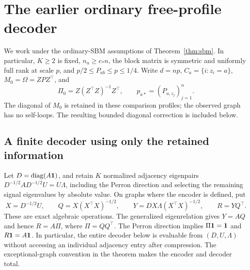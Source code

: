 \section{The earlier ordinary free-profile decoder}
\label{sec:sbm-proof}
\label{sbm:section}

We work under the ordinary-SBM assumptions of Theorem~\ref{thm:sbm}.
In particular, $K\ge2$ is fixed, $n_a\ge c_*n$, the block matrix is
symmetric and uniformly full rank at scale $p$, and
$p/2\le P_{ab}\le p\le1/4$. Write $d=np$, $C_a=\{i:z_i=a\}$,
$M_0=\Omega=ZPZ^\top$, and
\[
 \Pi_0=Z(Z^\top Z)^{-1}Z^\top,
 \qquad p_{a*}=(P_{a,z_j})_{j=1}^n.
\]
The diagonal of $M_0$ is retained in these comparison profiles;
the observed graph has no self-loops. The resulting bounded diagonal
correction is included below.

\subsection{A finite decoder using only the retained information}
\label{sbm:algorithm}

Let $D=\operatorname{diag}(A\mathbf 1)$, and retain $K$ normalized adjacency eigenpairs
$D^{-1/2}AD^{-1/2}U=U\Lambda$, including the Perron direction and
selecting the remaining signal eigenvalues by absolute value. On graphs
where the encoder is defined, put
\[
 X=D^{-1/2}U,\qquad
 Q=X(X^\top X)^{-1/2},\qquad
 Y=DX\Lambda(X^\top X)^{-1/2},\qquad
 R=YQ^\top.
\]
These are exact algebraic operations. The generalized eigenrelation gives
$Y=AQ$ and hence $R=A\Pi$, where $\Pi=QQ^\top$. The Perron direction
implies $\Pi\mathbf 1=\mathbf 1$ and $R\mathbf 1=A\mathbf 1$. In particular, the entire
decoder below is evaluable from $(D,U,\Lambda)$ without accessing an
individual adjacency entry after compression. The exceptional-graph
convention in the theorem makes the encoder and decoder total.

